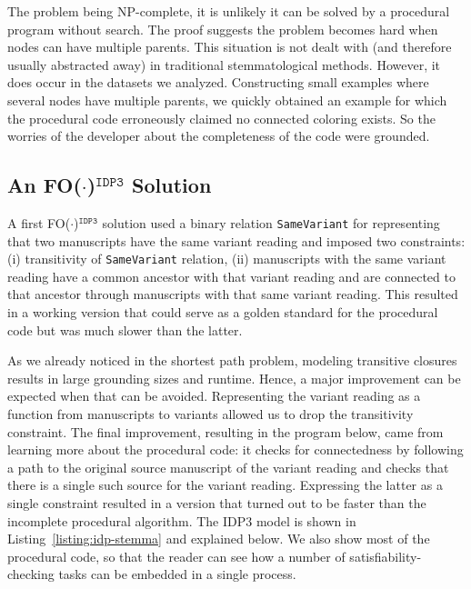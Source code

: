 \documentclass{tlp}
\newcommand{\idpdrie}{{\sc IDP3}\xspace}
\newcommand{\fodotidp}{{\sc FO($\cdot$)$^{\mathtt{IDP3}}$}\xspace}
\renewcommand{\|}{\ensuremath{\,|\,}}
\renewcommand{\|}{\,|\,}
\begin{document}
The problem being NP-complete, it is unlikely it can be solved by a
procedural program without search. The proof suggests the problem
becomes hard when nodes can have multiple parents. This situation is
not dealt with (and therefore usually abstracted away) in
traditional stemmatological methods. However, it does occur in the
datasets we analyzed. Constructing small examples where several nodes
have multiple parents, we quickly obtained an example for which the
procedural code erroneously claimed no connected coloring exists.  So
the worries of the developer about the completeness of the code were
grounded.




\subsection{An \fodotidp Solution}


A first \fodotidp solution used a binary relation \texttt{SameVariant}
for representing that two manuscripts have the same variant reading
and imposed two constraints: (i) transitivity of \texttt{SameVariant}
relation, (ii) manuscripts with the same variant reading have a common
ancestor with that variant reading and are connected to that ancestor
through manuscripts with that same variant reading. This resulted in a
working version that could serve as a golden standard for the
procedural code but was much slower than the latter.

As we already noticed in the shortest path problem, modeling
transitive closures results in large grounding sizes and
runtime. Hence, a major improvement can be expected when that can be
avoided. Representing the variant reading as a function from
manuscripts to variants allowed us to drop the transitivity
constraint.  The final improvement, resulting in the program below,
came from learning more about the procedural code: it checks for
connectedness by following a path to the original source manuscript of
the variant reading and checks that there is a single such source for
the variant reading. Expressing the latter as a single constraint
resulted in a version that turned out to be faster than the incomplete
procedural algorithm. The \idpdrie model is shown in
Listing~\ref{listing:idp-stemma} and explained below. 
We also show most of the procedural
code, so that the reader can see how a number of satisfiability-checking tasks
can be embedded in a single process.
\end{document}
